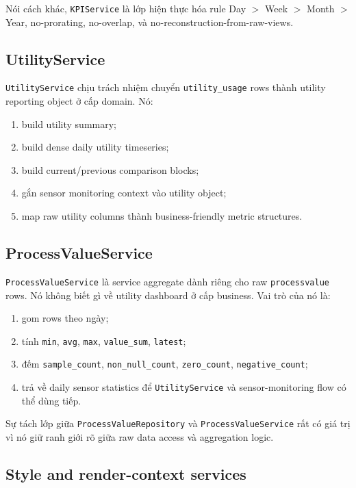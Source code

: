 Nói cách khác, \texttt{KPIService} là lớp hiện thực hóa rule Day $>$ Week $>$ Month $>$ Year, no-prorating, no-overlap, và no-reconstruction-from-raw-views.

\subsection{UtilityService}

\texttt{UtilityService} chịu trách nhiệm chuyển \texttt{utility\_usage} rows thành utility reporting object ở cấp domain. Nó:

\begin{enumerate}[label=-]
\item build utility summary;
\item build dense daily utility timeseries;
\item build current/previous comparison blocks;
\item gắn sensor monitoring context vào utility object;
\item map raw utility columns thành business-friendly metric structures.
\end{enumerate}

\subsection{ProcessValueService}

\texttt{ProcessValueService} là service aggregate dành riêng cho raw \texttt{processvalue} rows. Nó không biết gì về utility dashboard ở cấp business. Vai trò của nó là:

\begin{enumerate}[label=-]
\item gom rows theo ngày;
\item tính \texttt{min}, \texttt{avg}, \texttt{max}, \texttt{value\_sum}, \texttt{latest};
\item đếm \texttt{sample\_count}, \texttt{non\_null\_count}, \texttt{zero\_count}, \texttt{negative\_count};
\item trả về daily sensor statistics để \texttt{UtilityService} và sensor-monitoring flow có thể dùng tiếp.
\end{enumerate}

Sự tách lớp giữa \texttt{ProcessValueRepository} và \texttt{ProcessValueService} rất có giá trị vì nó giữ ranh giới rõ giữa raw data access và aggregation logic.

\subsection{Style and render-context services}

